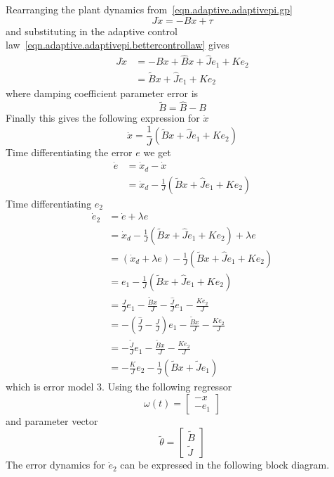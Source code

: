 Rearranging the plant dynamics from\ \eqref{eqn.adaptive.adaptivepi.gp}
\begin{equation*}
  J\dot{x}=-Bx+\tau
\end{equation*}
and substituting in the adaptive control law\ \eqref{eqn.adaptive.adaptivepi.bettercontrollaw} gives
\begin{align*}
  J\dot{x}&=-Bx+\hat{B}x+\hat{J}e_{1}+Ke_{2} \\
  &=\tilde{B}x+\hat{J}e_{1}+Ke_{2}
\end{align*}
where damping coefficient parameter error is
\begin{equation*}
  \tilde{B}=\hat{B}-B
\end{equation*}
Finally this gives the following expression for $\dot{x}$
\begin{equation*}
  \dot{x}=\frac{1}{J}\left(\tilde{B}x+\hat{J}e_{1}+Ke_{2}\right)
\end{equation*}
Time differentiating the error $e$ we get
\begin{align*}
  \dot{e}&=\dot{x}_{d}-\dot{x} \\
  &=\dot{x}_{d}-\frac{1}{J}\left(\tilde{B}x+\hat{J}e_{1}+Ke_{2}\right)
\end{align*}
Time differentiating $e_{2}$
\begin{align*}
  \dot{e}_{2}&=\dot{e}+\lambda e \\
  &=\dot{x}_{d}-\frac{1}{J}\left(\tilde{B}x+\hat{J}e_{1}+Ke_{2}\right)+\lambda e \\
  &=(\dot{x}_{d}+\lambda e)-\frac{1}{J}\left(\tilde{B}x+\hat{J}e_{1}+Ke_{2}\right) \\
  &=e_{1}-\frac{1}{J}\left(\tilde{B}x+\hat{J}e_{1}+Ke_{2}\right) \\
  &=\frac{J}{J}e_{1}-\frac{\tilde{B}x}{J}-\frac{\hat{J}}{J}e_{1}-\frac{Ke_{2}}{J} \\
  &=-\left(\frac{\hat{J}}{J}-\frac{J}{J}\right)e_{1}-\frac{\tilde{B}x}{J}-\frac{Ke_{2}}{J} \\
  &=-\frac{\tilde{J}}{J}e_{1}-\frac{\tilde{B}x}{J}-\frac{Ke_{2}}{J} \\
  &=-\frac{K}{J}e_{2}-\frac{1}{J}\left(\tilde{B}x+\tilde{J}e_{1}\right)
\end{align*}
which is error model 3.
Using the following regressor
\begin{equation*}
  \omega(t)=
  \begin{bmatrix}
    -x \\ -e_{1}
  \end{bmatrix}
\end{equation*}
and parameter vector
\begin{equation*}
  \tilde{\theta}=
  \begin{bmatrix}
    \tilde{B} \\ \tilde{J}
  \end{bmatrix}
\end{equation*}
The error dynamics for $\dot{e}_{2}$ can be expressed in the following block diagram.

